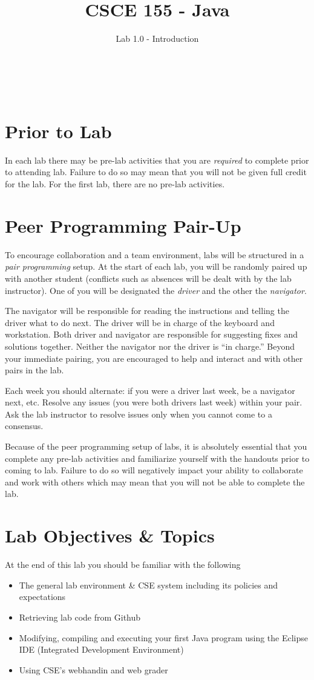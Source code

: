 \documentclass[12pt]{scrartcl}
\title{CSCE 155 - Java}
\subtitle{Lab 1.0 - Introduction}
\author{~}
\date{~}
\begin{document}
\maketitle

\section*{Prior to Lab}

In each lab there may be pre-lab activities that you are \emph{required} to
complete prior to attending lab.  Failure to do so may mean that you will
not be given full credit for the lab.  For the first lab, there are no pre-lab
activities.

\section*{Peer Programming Pair-Up}

To encourage collaboration and a team environment, labs will be
structured in a \emph{pair programming} setup.  At the start of
each lab, you will be randomly paired up with another student 
(conflicts such as absences will be dealt with by the lab instructor).
One of you will be designated the \emph{driver} and the other
the \emph{navigator}.  

The navigator will be responsible for reading the instructions and
telling the driver what to do next.  The driver will be in charge of the
keyboard and workstation.  Both driver and navigator are responsible
for suggesting fixes and solutions together.  Neither the navigator
nor the driver is ``in charge.''  Beyond your immediate pairing, you
are encouraged to help and interact and with other pairs in the lab.

Each week you should alternate: if you were a driver last week, 
be a navigator next, etc.  Resolve any issues (you were both drivers
last week) within your pair.  Ask the lab instructor to resolve issues
only when you cannot come to a consensus.  

Because of the peer programming setup of labs, it is absolutely 
essential that you complete any pre-lab activities and familiarize
yourself with the handouts prior to coming to lab.  Failure to do
so will negatively impact your ability to collaborate and work with 
others which may mean that you will not be able to complete the
lab.  

\section{Lab Objectives \& Topics}
At the end of this lab you should be familiar with the following
\begin{itemize}
  \item The general lab environment \& CSE system including its policies and expectations
  \item Retrieving lab code from Github
  \item Modifying, compiling and executing your first Java 
    program using the Eclipse IDE (Integrated Development 
	Environment)
  \item Using CSE's webhandin and web grader
\end{itemize}
\end{document}
